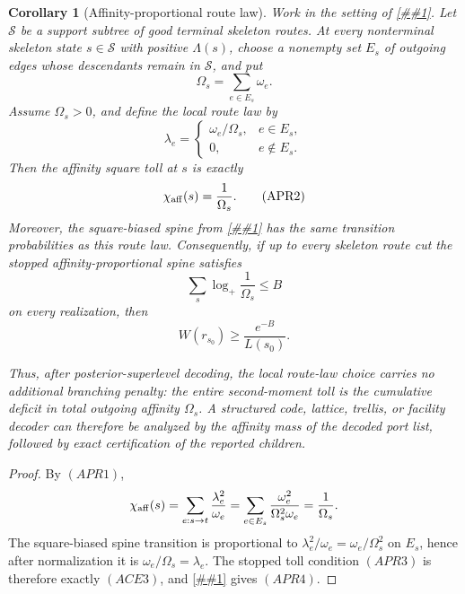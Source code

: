 \documentclass[10pt]{article}
\newcommand{\cref}[1]{\ref{##1}}
\newtheorem{corollary}[theorem]{Corollary}
\theoremstyle{definition}
\begin{document}
\begin{corollary}[Affinity-proportional route law]
   \label{cor:affinity-proportional-route-law}
   Work in the setting of \cref{cor:affinity-cut-energy}.  Let
   \(\mathcal S\) be a support subtree of good terminal skeleton routes.  At
   every nonterminal skeleton state \(s\in\mathcal S\) with positive
   \(\Lambda(s)\), choose a nonempty set \(E_s\) of outgoing edges whose
   descendants remain in \(\mathcal S\), and put
   \[
      \Omega_s=\sum_{e\in E_s}\omega_e .
      \tag{APR0}
   \]
   Assume \(\Omega_s>0\), and define the local route law by
   \[
      \lambda_e=
      \begin{cases}
         \omega_e/\Omega_s,& e\in E_s,\\
         0,& e\notin E_s .
      \end{cases}
      \tag{APR1}
   \]
   Then the affinity square toll at \(s\) is exactly
   \[
      \chi_{\rm aff}(s)=\frac1{\Omega_s}.
      \tag{APR2}
   \]
   Moreover, the square-biased spine from \cref{cor:affinity-cut-energy}
   has the same transition probabilities as this route law.  Consequently, if
   up to every skeleton route cut the stopped affinity-proportional spine
   satisfies
   \[
      \sum_s\log_+\frac1{\Omega_s}\le B
      \tag{APR3}
   \]
   on every realization, then
   \[
      W(r_{s_0})\ge\frac{e^{-B}}{L(s_0)}.
      \tag{APR4}
   \]

   Thus, after posterior-superlevel decoding, the local route-law choice
   carries no additional branching penalty: the entire second-moment toll is
   the cumulative deficit in total outgoing affinity \(\Omega_s\).  A
   structured code, lattice, trellis, or facility decoder can therefore be
   analyzed by the affinity mass of the decoded port list, followed by exact
   certification of the reported children.
\end{corollary}

\begin{proof}
   By \((APR1)\),
   \[
      \chi_{\rm aff}(s)
      =
      \sum_{e:s\to t}\frac{\lambda_e^2}{\omega_e}
      =
      \sum_{e\in E_s}
      \frac{\omega_e^2}{\Omega_s^2\omega_e}
      =
      \frac1{\Omega_s}.
   \]
   The square-biased spine transition is proportional to
   \(\lambda_e^2/\omega_e=\omega_e/\Omega_s^2\) on \(E_s\), hence after
   normalization it is \(\omega_e/\Omega_s=\lambda_e\).  The stopped toll
   condition \((APR3)\) is therefore exactly \((ACE3)\), and
   \cref{cor:affinity-cut-energy} gives \((APR4)\).
\end{proof}
\end{document}
